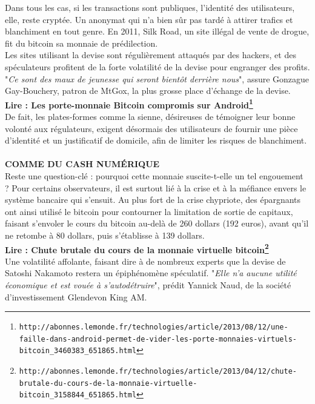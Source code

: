 \documentclass[11pt,twoside,a4paper]{article}
\begin{document}
Dans tous les cas, si les transactions sont publiques, l'identit{\'e} des utilisateurs, elle, reste crypt{\'e}e. Un anonymat qui n'a bien s{\^u}r pas tard{\'e} {\`a} attirer trafics et blanchiment en tout genre. En 2011, Silk Road, un site ill{\'e}gal de vente de drogue, fit du bitcoin sa monnaie de pr{\'e}dilection. ~\\

Les sites utilisant la devise sont r{\'e}guli{\`e}rement attaqu{\'e}s par des hackers, et des sp{\'e}culateurs profitent de la forte volatilit{\'e} de la devise pour engranger des profits. "\emph{Ce sont des maux de jeunesse qui seront bient{\^o}t derri{\`e}re nous}", assure Gonzague Gay-Bouchery, patron de MtGox, la plus grosse place d'{\'e}change de la devise. ~\\

\textbf{Lire : Les porte-monnaie Bitcoin compromis sur Android\footnote{\texttt{http://abonnes.lemonde.fr/technologies/article/2013/08/12/une-faille-dans-android-permet-de-vider-les-porte-monnaies-virtuels-bitcoin\_3460383\_651865.html}}} ~\\

De fait, les plates-formes comme la sienne, d{\'e}sireuses de t{\'e}moigner leur bonne volont{\'e} aux r{\'e}gulateurs, exigent d{\'e}sormais des utilisateurs de fournir une pi{\`e}ce d'identit{\'e} et un justificatif de domicile, afin de limiter les risques de blanchiment. ~\\

\textbf{COMME DU CASH NUM{\'E}RIQUE} ~\\

Reste une question-cl{\'e} : pourquoi cette monnaie suscite-t-elle un tel engouement ? Pour certains observateurs, il est surtout li{\'e} {\`a} la crise et {\`a} la m{\'e}fiance envers le syst{\`e}me bancaire qui s'ensuit. Au plus fort de la crise chypriote, des {\'e}pargnants ont ainsi utilis{\'e} le bitcoin pour contourner la limitation de sortie de capitaux, faisant s'envoler le cours du bitcoin au-del{\`a} de 260 dollars (192 euros), avant qu'il ne retombe {\`a} 80 dollars, puis s'{\'e}tablisse {\`a} 139 dollars. ~\\

\textbf{Lire : Chute brutale du cours de la monnaie virtuelle bitcoin\footnote{\texttt{http://abonnes.lemonde.fr/technologies/article/2013/04/12/chute-brutale-du-cours-de-la-monnaie-virtuelle-bitcoin\_3158844\_651865.html}}} ~\\

Une volatilit{\'e} affolante, faisant dire {\`a} de nombreux experts que la devise de Satoshi Nakamoto restera un {\'e}piph{\'e}nom{\`e}ne sp{\'e}culatif. "\emph{Elle n'a aucune utilit{\'e} {\'e}conomique et est vou{\'e}e {\`a} s'autod{\'e}truire}", pr{\'e}dit Yannick Naud, de la soci{\'e}t{\'e} d'investissement Glendevon King AM. ~\\
\end{document}
